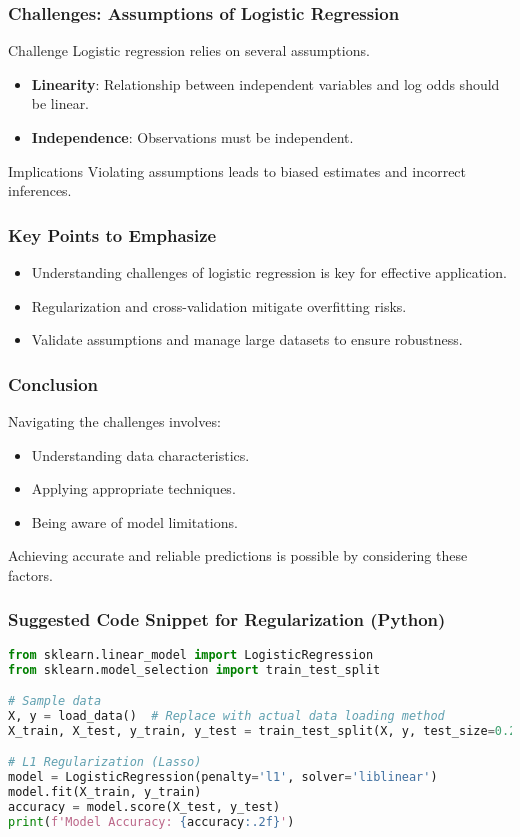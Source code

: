 \documentclass[aspectratio=169]{beamer}
\begin{document}
\begin{frame}
    \frametitle{Challenges: Assumptions of Logistic Regression}
    \begin{block}{Challenge}
        Logistic regression relies on several assumptions.
    \end{block}
    \begin{itemize}
        \item \textbf{Linearity}: Relationship between independent variables and log odds should be linear.
        \item \textbf{Independence}: Observations must be independent.
    \end{itemize}
    \begin{block}{Implications}
        Violating assumptions leads to biased estimates and incorrect inferences.
    \end{block}
\end{frame}

\begin{frame}[fragile]
    \frametitle{Key Points to Emphasize}
    \begin{itemize}
        \item Understanding challenges of logistic regression is key for effective application.
        \item Regularization and cross-validation mitigate overfitting risks.
        \item Validate assumptions and manage large datasets to ensure robustness.
    \end{itemize}
\end{frame}

\begin{frame}[fragile]
    \frametitle{Conclusion}
    Navigating the challenges involves:
    \begin{itemize}
        \item Understanding data characteristics.
        \item Applying appropriate techniques.
        \item Being aware of model limitations.
    \end{itemize}
    Achieving accurate and reliable predictions is possible by considering these factors.
\end{frame}

\begin{frame}[fragile]
    \frametitle{Suggested Code Snippet for Regularization (Python)}
    \begin{lstlisting}[language=Python]
from sklearn.linear_model import LogisticRegression
from sklearn.model_selection import train_test_split

# Sample data
X, y = load_data()  # Replace with actual data loading method
X_train, X_test, y_train, y_test = train_test_split(X, y, test_size=0.2)

# L1 Regularization (Lasso)
model = LogisticRegression(penalty='l1', solver='liblinear')
model.fit(X_train, y_train)
accuracy = model.score(X_test, y_test)
print(f'Model Accuracy: {accuracy:.2f}')
    \end{lstlisting}
\end{frame}
\end{document}
